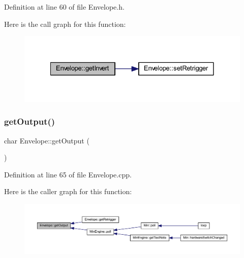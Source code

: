 Definition at line 60 of file Envelope.\+h.

Here is the call graph for this function\+:
\nopagebreak
\begin{figure}[H]
\begin{center}
\leavevmode
\includegraphics[width=328pt]{d7/df3/class_envelope_a90c62a0768be44808c1a1ea731ff1f7c_cgraph}
\end{center}
\end{figure}
\mbox{\label{class_envelope_a962be8de5485992477ef09c7038812b2}} 
\subsubsection{\texorpdfstring{get\+Output()}{getOutput()}}
{\footnotesize\ttfamily char Envelope\+::get\+Output (\begin{DoxyParamCaption}{ }\end{DoxyParamCaption})}



Definition at line 65 of file Envelope.\+cpp.

Here is the caller graph for this function\+:
\nopagebreak
\begin{figure}[H]
\begin{center}
\leavevmode
\includegraphics[width=350pt]{d7/df3/class_envelope_a962be8de5485992477ef09c7038812b2_icgraph}
\end{center}
\end{figure}
\mbox{\label{class_envelope_a96815367d569e8bdd8d5798475a0ab76}} 
